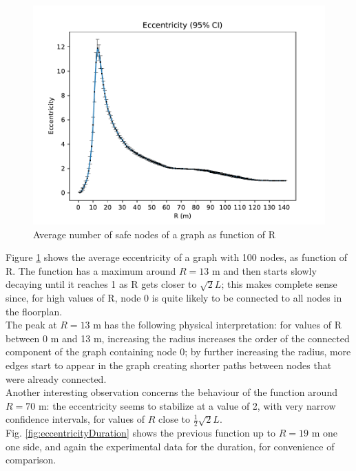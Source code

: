 \begin{figure}[H]
    \begin{center}
        \includegraphics[scale=.6]{img/graphAnalysisEccentricity.pdf}
    \end{center}
    \vspace*{-0.5cm}
    \caption{Average number of safe nodes of a graph as function of R}
    \label{fig:eccentricityFull}
\end{figure}
\hfill \break
Figure \ref{fig:eccentricityFull} shows the average eccentricity of a graph with 100 nodes, as function of R.
The function has a maximum around $R = 13$ m and then starts slowly decaying until it reaches 1 as R gets closer to $\sqrt{2}L$; this makes complete sense since, for high values of R, node 0 is quite likely to be connected to all nodes in the floorplan.\\
The peak at $R=13$ m has the following physical interpretation: for values of R between 0 m and 13 m, increasing the radius increases the order of the connected component of the graph containing node 0; by further increasing the radius, more edges start to appear in the graph creating shorter paths between nodes that were already connected.\\
Another interesting observation concerns the behaviour of the function around $R = 70$ m: the eccentricity seems to stabilize at a value of 2, with very narrow confidence intervals, for values  of $R$ close to $\frac{1}{2}\sqrt{2}L$.\\
Fig. \ref{fig:eccentricityDuration} shows the previous function up to $R=19$ m one one side, and again the experimental data for the duration, for convenience of comparison.\\
